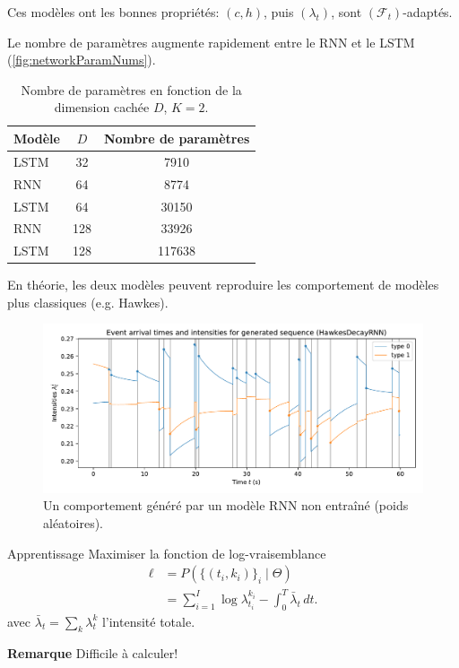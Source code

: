 \documentclass{beamer}
\begin{document}
\begin{frame}
Ces modèles ont les bonnes propriétés: $(c,h)$, puis $(\lambda_t)$, sont $(\mathcal{F}_t)$-adaptés.

Le nombre de paramètres augmente rapidement entre le RNN et le LSTM (\autoref{fig:networkParamNums}).

\begin{table}
	\begin{tabular}{l|cc}\toprule
	Modèle & $D$ & Nombre de paramètres \\ \midrule
	LSTM & 32 & 7910 \\
	RNN & 64 & 8774 \\
	LSTM & 64 & 30150 \\
	RNN & 128 & 33926 \\
	LSTM & 128 & 117638 \\ \bottomrule
	\end{tabular}\caption{Nombre de paramètres en fonction de la dimension cachée $D$, $K=2$.}\label{fig:networkParamNums}
\end{table}

\end{frame}

\begin{frame}
En théorie, les deux modèles peuvent reproduire les comportement de modèles plus classiques (e.g. Hawkes).

\begin{figure}
	\includegraphics[width=\linewidth]{../notebooks/example_rnnplot2d_hidden128.pdf}
	\caption{Un comportement généré par un modèle RNN non entraîné (poids aléatoires).}\label{fig:untrained1DRNNIntensity}
\end{figure}
	
\end{frame}

\begin{frame}{Apprentissage}
Maximiser la fonction de log-vraisemblance
\begin{equation}\label{eq:logLikelihood}
\begin{aligned}
\ell &= P\left( \{(t_i,k_i)\}_i \mid \Theta \right) \\
&= \sum_{i=1}^{I}\log \lambda^{k_i}_{t_i} - \int_0^T \bar{\lambda}_t\,dt.
\end{aligned}
\end{equation}
avec $\bar{\lambda}_t = \sum_k \lambda^k_t$ l'intensité totale.

\textbf{Remarque} Difficile à calculer!
\end{frame}
\end{document}
